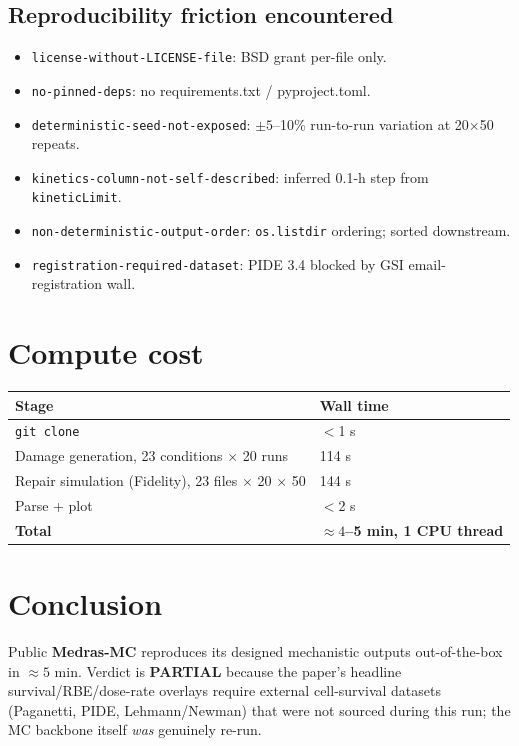\documentclass[11pt]{article}
\begin{document}
\subsection*{Reproducibility friction encountered}
\begin{itemize}
  \item \texttt{license-without-LICENSE-file}: BSD grant per-file only.
  \item \texttt{no-pinned-deps}: no requirements.txt / pyproject.toml.
  \item \texttt{deterministic-seed-not-exposed}: $\pm 5$--10\% run-to-run variation at 20$\times$50 repeats.
  \item \texttt{kinetics-column-not-self-described}: inferred 0.1-h step from \texttt{kineticLimit}.
  \item \texttt{non-deterministic-output-order}: \texttt{os.listdir} ordering; sorted downstream.
  \item \texttt{registration-required-dataset}: PIDE 3.4 blocked by GSI email-registration wall.
\end{itemize}

\section{Compute cost}
\begin{tabular}{ll}
\toprule
Stage & Wall time \\
\midrule
\texttt{git clone} & $<$1 s \\
Damage generation, 23 conditions $\times$ 20 runs & 114 s \\
Repair simulation (Fidelity), 23 files $\times$ 20 $\times$ 50 & 144 s \\
Parse + plot & $<$2 s \\
\textbf{Total} & \textbf{$\approx 4$--5 min, 1 CPU thread} \\
\bottomrule
\end{tabular}

\section{Conclusion}
Public \textbf{Medras-MC} reproduces its designed mechanistic outputs out-of-the-box in $\approx 5$ min. Verdict is \textbf{PARTIAL} because the paper's headline survival/RBE/dose-rate overlays require external cell-survival datasets (Paganetti, PIDE, Lehmann/Newman) that were not sourced during this run; the MC backbone itself \emph{was} genuinely re-run.


\end{document}
